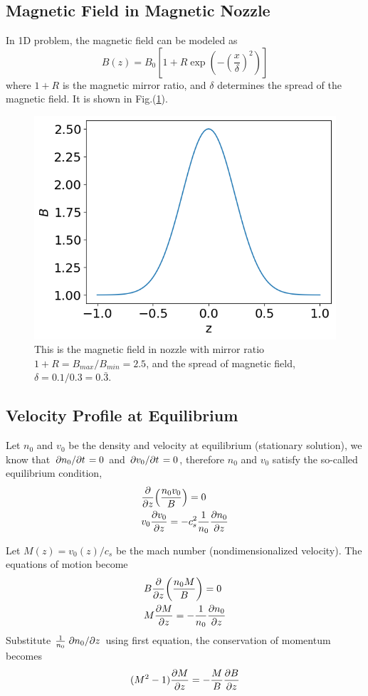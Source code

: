 \subsection{Magnetic Field in Magnetic Nozzle}
In 1D problem, the magnetic field can be modeled as
\[ B(z) = B_0 \left[1 + R\exp(-\left(\frac{x}{\delta}\right)^2)\right] \]
where $1+R$ is the magnetic mirror ratio, and $\delta$ determines the spread of the magnetic field. It is shown in Fig.(\ref{fig:magnetic-field}).
\begin{figure}[H]
	\centering
	\includegraphics[width=0.7\linewidth]{../../thesis/img/introduction/magnetic-field}
	\caption{This is the magnetic field in nozzle with mirror ratio $1+R=B_{max}/B_{min}=2.5$, and the spread of magnetic field, $\delta=0.1/0.3=0.\bar{3}$. }
	\label{fig:magnetic-field}
\end{figure}

\subsection{Velocity Profile at Equilibrium}
Let $n_0$ and $v_0$ be the density and velocity at equilibrium (stationary solution), we know that $\pdv*{n_0}{t}=0$ and $\pdv*{v_0}{t}=0$, therefore $n_0$ and $v_0$ satisfy the so-called equilibrium condition,
\begin{align*}
	&\pdv{z}(\frac{n_0v_0}{B}) = 0 \\
	&v_0\pdv{v_0}{z} = -c_s^2\frac{1}{n_0}\pdv{n_0}{z} 
\end{align*}

Let $M(z) = v_0(z)/c_s$ be the mach number (nondimensionalized velocity). The equations of motion become
\begin{align*}
	&B\pdv{z}(\frac{n_0M}{B}) = 0\\
	&M\pdv{M}{z} = -\frac{1}{n_0}\pdv{n_0}{z}
\end{align*}
Substitute $\frac{1}{n_0}\pdv*{n_0}{z}$ using first equation, the conservation of momentum becomes
\[ (M^2-1)\pdv{M}{z} = -\frac{M}{B}\pdv{B}{z} \]

